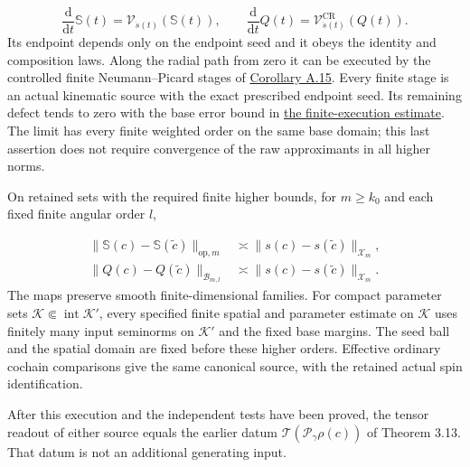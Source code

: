 \documentclass[
  english,
  11pt,
  reqno]{amsart}
\begin{document}
\label{eq:online-ordinary-source-actual-evolution} \[
\frac{\mathrm d}{\mathrm dt}\mathbb S(t)=\mathscr V_{\dot s(t)}(\mathbb S(t)),
\qquad
\frac{\mathrm d}{\mathrm dt}Q(t)=\mathscr V^{\mathrm{CR}}_{\dot s(t)}(Q(t)).
\] Its endpoint depends only on the endpoint seed and it obeys the
identity and composition laws. Along the radial path from zero it can be
executed by the controlled finite Neumann--Picard stages of
\hyperref[cor:online-current-finite-neumann-picard]{Corollary A.15}.
Every finite stage is an actual kinematic source with the exact
prescribed endpoint seed. Its remaining defect tends to zero with the
base error bound in
\hyperref[eq:online-current-finite-execution-error]{the finite-execution
estimate}. The limit has every finite weighted order on the same base
domain; this last assertion does not require convergence of the raw
approximants in all higher norms.

On retained sets with the required finite higher bounds, for
\(m\ge k_0\) and each fixed finite angular order \(l\),

\label{eq:online-ordinary-source-balanced-two-sided-bounds}
\[
\begin{aligned}
\|\mathbb S(c)-\mathbb S(\widetilde c)\|_{\mathrm{op},m}
&\asymp\|s(c)-s(\widetilde c)\|_{\mathcal X_m},\\
\|Q(c)-Q(\widetilde c)\|_{\mathcal B_{m,l}}
&\asymp\|s(c)-s(\widetilde c)\|_{\mathcal X_m}.
\end{aligned}
\] The maps preserve smooth finite-dimensional families. For compact
parameter sets \(\mathcal K\Subset\operatorname{int}\mathcal K'\), every
specified finite spatial and parameter estimate on \(\mathcal K\) uses
finitely many input seminorms on \(\mathcal K'\) and the fixed base
margins. The seed ball and the spatial domain are fixed before these
higher orders. Effective ordinary cochain comparisons give the same
canonical source, with the retained actual spin identification.

After this execution and the independent tests have been proved, the
tensor readout of either source equals the earlier datum
\(\mathcal T(\mathscr P_\gamma\rho(c))\) of Theorem 3.13. That datum is
not an additional generating input.
\end{document}
